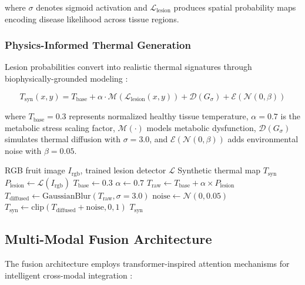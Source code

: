 \documentclass[utf8]{FrontiersinHarvard} %
\begin{document}
where $\sigma$ denotes sigmoid activation and $\mathcal{L}_{\text{lesion}}$ produces spatial probability maps encoding disease likelihood across tissue regions.

\subsubsection{Physics-Informed Thermal Generation}
Lesion probabilities convert into realistic thermal signatures through biophysically-grounded modeling \cite{raissi2019}:

\begin{equation}
    T_{\text{syn}}(x,y) = T_{\text{base}} + \alpha \cdot \mathcal{M}(\mathcal{L}_{\text{lesion}}(x,y)) + \mathcal{D}(G_{\sigma}) + \mathcal{E}(\mathcal{N}(0,\beta))
    \label{eq:thermal_synthesis}
\end{equation}

where $T_{\text{base}} = 0.3$ represents normalized healthy tissue temperature, $\alpha = 0.7$ is the metabolic stress scaling factor, $\mathcal{M}(\cdot)$ models metabolic dysfunction, $\mathcal{D}(G_{\sigma})$ simulates thermal diffusion with $\sigma = 3.0$, and $\mathcal{E}(\mathcal{N}(0,\beta))$ adds environmental noise with $\beta = 0.05$.

\begin{algorithm}[H]
    \caption{Thermal Synthesis Pipeline}
    \label{alg:thermal}
    \begin{algorithmic}[1]
        \REQUIRE RGB fruit image $I_{\text{rgb}}$, trained lesion detector $\mathcal{L}$
        \ENSURE Synthetic thermal map $T_{\text{syn}}$
        \STATE $P_{\text{lesion}} \leftarrow \mathcal{L}(I_{\text{rgb}})$
        \STATE $T_{\text{base}} \leftarrow 0.3$
        \STATE $\alpha \leftarrow 0.7$
        \STATE $T_{\text{raw}} \leftarrow T_{\text{base}} + \alpha \times P_{\text{lesion}}$
        \STATE $T_{\text{diffused}} \leftarrow \text{GaussianBlur}(T_{\text{raw}}, \sigma=3.0)$
        \STATE $\text{noise} \leftarrow \mathcal{N}(0, 0.05)$
        \STATE $T_{\text{syn}} \leftarrow \text{clip}(T_{\text{diffused}} + \text{noise}, 0, 1)$
        \RETURN $T_{\text{syn}}$
    \end{algorithmic}
\end{algorithm}

\subsection{Multi-Modal Fusion Architecture}
The fusion architecture employs transformer-inspired attention mechanisms for intelligent cross-modal integration \cite{vaswani2017,devlin2019}:
\end{document}
